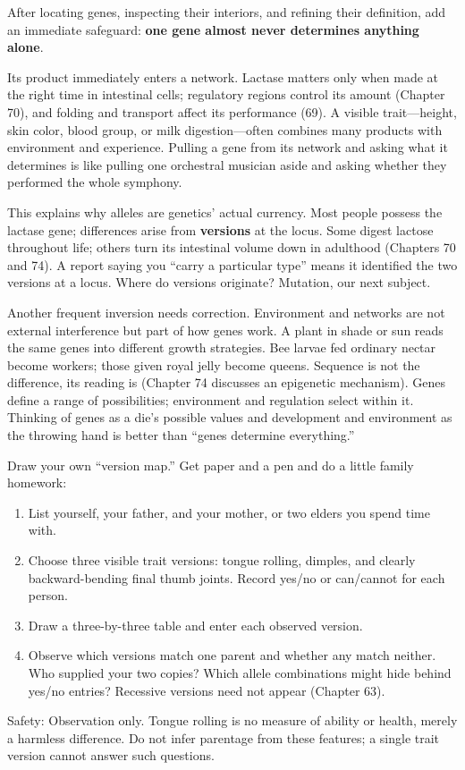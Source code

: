After locating genes, inspecting their interiors, and refining their definition, add an immediate safeguard: \textbf{one gene almost never determines anything alone}.

Its product immediately enters a network. Lactase matters only when made at the right time in intestinal cells; regulatory regions control its amount (Chapter 70), and folding and transport affect its performance (69). A visible trait---height, skin color, blood group, or milk digestion---often combines many products with environment and experience. Pulling a gene from its network and asking what it determines is like pulling one orchestral musician aside and asking whether they performed the whole symphony.

This explains why alleles are genetics' actual currency. Most people possess the lactase gene; differences arise from \textbf{versions} at the locus. Some digest lactose throughout life; others turn its intestinal volume down in adulthood (Chapters 70 and 74). A report saying you ``carry a particular type'' means it identified the two versions at a locus. Where do versions originate? Mutation, our next subject.

Another frequent inversion needs correction. Environment and networks are not external interference but part of how genes work. A plant in shade or sun reads the same genes into different growth strategies. Bee larvae fed ordinary nectar become workers; those given royal jelly become queens. Sequence is not the difference, its reading is (Chapter 74 discusses an epigenetic mechanism). Genes define a range of possibilities; environment and regulation select within it. Thinking of genes as a die's possible values and development and environment as the throwing hand is better than ``genes determine everything.''

\begin{shiyan}
Draw your own ``version map.'' Get paper and a pen and do a little family homework:
\begin{enumerate}[itemsep=1pt]
\item List yourself, your father, and your mother, or two elders you spend time with.
\item Choose three visible trait versions: tongue rolling, dimples, and clearly backward-bending final thumb joints. Record yes/no or can/cannot for each person.
\item Draw a three-by-three table and enter each observed version.
\item Observe which versions match one parent and whether any match neither. Who supplied your two copies? Which allele combinations might hide behind yes/no entries? Recessive versions need not appear (Chapter 63).
\end{enumerate}
Safety: Observation only. Tongue rolling is no measure of ability or health, merely a harmless difference. Do not infer parentage from these features; a single trait version cannot answer such questions.
\end{shiyan}

